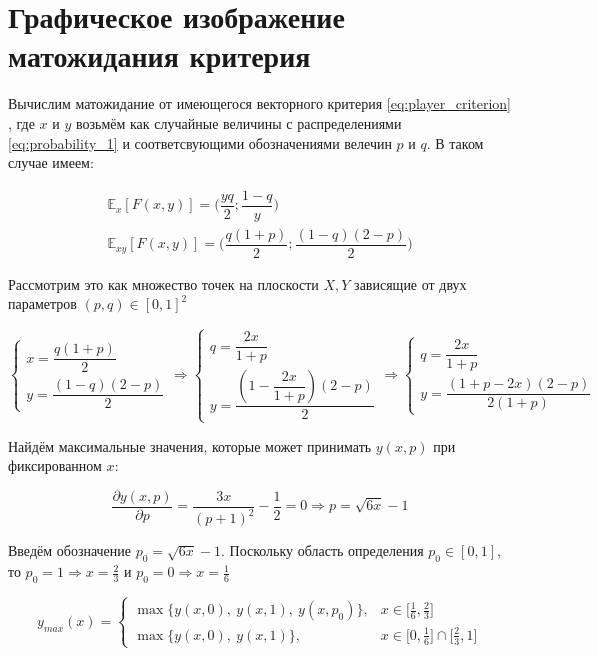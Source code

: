 \section{Графическое изображение матожидания критерия}
Вычислим матожидание от имеющегося векторного критерия \eqref{eq:player_criterion}
, где $x$ и $y$ возьмём как случайные величины с распределениями \eqref{eq:probability_1}
и соответсвующими обозначениями велечин $p$ и $q$. В таком случае имеем:

\begin{gather*}
	\mathbb{E}_x [F(x,y)]=
	\Big(
		\dfrac{yq}{2};
		\dfrac{1-q}{y}
	\Big)
	\\
	\mathbb{E}_{xy} [F(x,y)]=
	\big(
		\dfrac{q(1+p)}{2};
		\dfrac{(1-q)(2-p)}{2}
	\Big)
\end{gather*}

Рассмотрим это как множество точек на плоскости $X,Y$ зависящие от двух параметров $(p,q)\in[0,1]^2$

$$
	\begin{cases}
		x = \dfrac{q(1 + p)}{2} \\
		y = \dfrac{(1 - q)(2 - p)}{2}  
	\end{cases}
	\Rightarrow
	\begin{cases}
		q = \dfrac{2x}{1 + p} \\
		y = \dfrac{(1 - \dfrac{2x}{1 + p})(2 - p)}{2}		
	\end{cases}
	\Rightarrow
	\begin{cases}
		q = \dfrac{2x}{1 + p} \\
		y = \dfrac{(1 + p - 2x)(2 - p)}{2(1 + p)}
	\end{cases}
$$

Найдём максимальные значения, которые может принимать $y(x, p)$ при фиксированном $x$:

$$
	\dfrac{\partial y(x, p)}{\partial p}=\frac{3x}{(p+1)^2} - \frac{1}{2} = 0 
	\Rightarrow
	p = \sqrt{6x} - 1
$$

Введём обозначение $p_0 = \sqrt{6x} - 1$. Поскольку область определения 
$p_0 \in [0, 1]$, то $p_0 = 1 \Rightarrow x = \frac{2}{3}$ и 
$p_0 = 0 \Rightarrow x = \frac{1}{6}$
 
$$
	y_{max}(x) = 
	\begin{cases}
		\max \{ y(x, 0), \: y(x, 1), \: y(x, p_0) \}, & 
		x \in \big[ \frac{1}{6}, \frac{2}{3} \big]
		\\
		\max \{ y(x, 0), \: y(x, 1) \}, &
		x \in \big[0, \frac{1}{6} \big] \cap \big[\frac{2}{3}, 1\big]
	\end{cases}
$$

